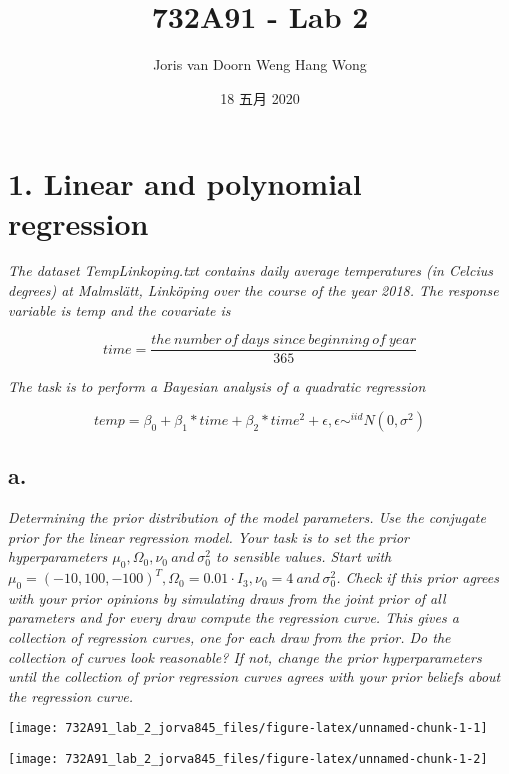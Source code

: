 \documentclass[]{article}
\title{732A91 - Lab 2}
\author{Joris van Doorn \textbar\textbar{} Weng Hang Wong}
\date{18 五月 2020}
\begin{document}
\maketitle

\hypertarget{linear-and-polynomial-regression}{%
\section{1. Linear and polynomial
regression}\label{linear-and-polynomial-regression}}

\emph{The dataset TempLinkoping.txt contains daily average temperatures
(in Celcius degrees) at Malmslätt, Linköping over the course of the year
2018. The response variable is temp and the covariate is}

\[time = \frac{the\: number\: of\: days\: since\: beginning\: of\: year}{365}\]

\emph{The task is to perform a Bayesian analysis of a quadratic
regression}

\[temp=\beta_0+\beta_1*time+\beta_2*time^2+\epsilon,\epsilon\sim^{iid}N(0,\sigma^2)\]

\hypertarget{a.}{%
\subsection{a.}\label{a.}}

\emph{Determining the prior distribution of the model parameters. Use
the conjugate prior for the linear regression model. Your task is to set
the prior hyperparameters \(\mu_0, \Omega_0, \nu_0 \:and\:\sigma_0^2\)
to sensible values. Start with
\(\mu_0=(-10,100,-100)^T,\Omega_0=0.01\cdot I_3,\nu_0=4\:and\:\sigma_0^2\).
Check if this prior agrees with your prior opinions by simulating draws
from the joint prior of all parameters and for every draw compute the
regression curve. This gives a collection of regression curves, one for
each draw from the prior. Do the collection of curves look reasonable?
If not, change the prior hyperparameters until the collection of prior
regression curves agrees with your prior beliefs about the regression
curve.}

\begin{center}\texttt{[image: 732A91\_lab\_2\_jorva845\_files/figure-latex/unnamed-chunk-1-1]} \end{center}

\begin{center}\texttt{[image: 732A91\_lab\_2\_jorva845\_files/figure-latex/unnamed-chunk-1-2]} \end{center}
\end{document}
